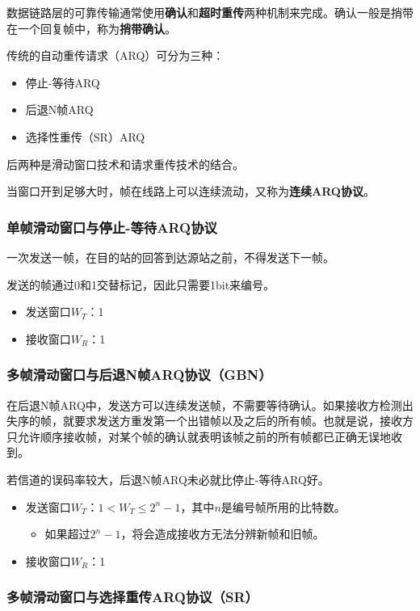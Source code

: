 \documentclass[12pt, a4paper, oneside]{ctexart}
\begin{document}
数据链路层的可靠传输通常使用\textbf{确认}和\textbf{超时重传}两种机制来完成。确认一般是捎带在一个回复帧中，称为\textbf{捎带确认}。

传统的自动重传请求（ARQ）可分为三种：
\begin{itemize}
    \item 停止-等待ARQ
    \item 后退N帧ARQ
    \item 选择性重传（SR）ARQ
\end{itemize}
后两种是滑动窗口技术和请求重传技术的结合。

当窗口开到足够大时，帧在线路上可以连续流动，又称为\textbf{连续ARQ协议}。

\subsubsection{单帧滑动窗口与停止-等待ARQ协议}

一次发送一帧，在目的站的回答到达源站之前，不得发送下一帧。

发送的帧通过0和1交替标记，因此只需要1bit来编号。

\begin{itemize}
    \item 发送窗口$W_T$：1
    \item 接收窗口$W_R$：1
\end{itemize}

\subsubsection{多帧滑动窗口与后退N帧ARQ协议（GBN）}

在后退N帧ARQ中，发送方可以连续发送帧，不需要等待确认。如果接收方检测出失序的帧，就要求发送方重发第一个出错帧以及之后的所有帧。也就是说，接收方只允许顺序接收帧，对某个帧的确认就表明该帧之前的所有帧都已正确无误地收到。

若信道的误码率较大，后退N帧ARQ未必就比停止-等待ARQ好。

\begin{itemize}
    \item 发送窗口$W_T$：$1<W_T\leq 2^n-1$，其中$n$是编号帧所用的比特数。
    \begin{itemize}
        \item 如果超过$2^n-1$，将会造成接收方无法分辨新帧和旧帧。
    \end{itemize}
    \item 接收窗口$W_R$：1
\end{itemize}

\subsubsection{多帧滑动窗口与选择重传ARQ协议（SR）}
\end{document}
